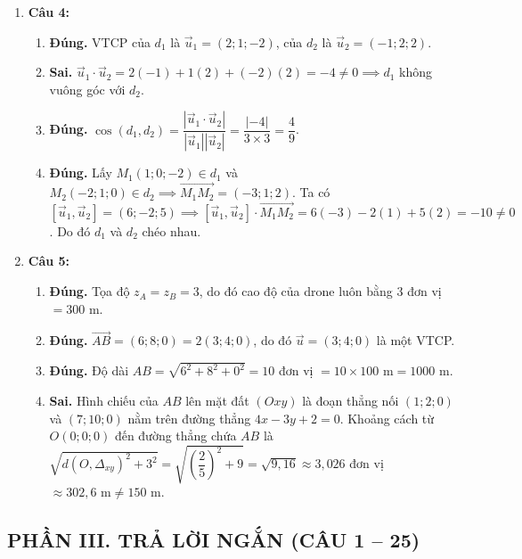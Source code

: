 \documentclass[12pt,a4paper]{article}
\begin{document}
\begin{enumerate}
\item \textbf{Câu 4:}
\begin{enumerate}[label=\alph*)]
    \item \textbf{Đúng.} VTCP của $d_1$ là $\vec{u}_1 = (2; 1; -2)$, của $d_2$ là $\vec{u}_2 = (-1; 2; 2)$.
    \item \textbf{Sai.} $\vec{u}_1 \cdot \vec{u}_2 = 2(-1) + 1(2) + (-2)(2) = -4 \ne 0 \implies d_1$ không vuông góc với $d_2$.
    \item \textbf{Đúng.} $\cos(d_1, d_2) = \dfrac{|\vec{u}_1 \cdot \vec{u}_2|}{|\vec{u}_1||\vec{u}_2|} = \dfrac{|-4|}{3 \times 3} = \dfrac{4}{9}$.
    \item \textbf{Đúng.} Lấy $M_1(1; 0; -2) \in d_1$ và $M_2(-2; 1; 0) \in d_2 \implies \vec{M_1M_2} = (-3; 1; 2)$.  
    Ta có $[\vec{u}_1, \vec{u}_2] = (6; -2; 5) \implies [\vec{u}_1, \vec{u}_2] \cdot \vec{M_1M_2} = 6(-3) - 2(1) + 5(2) = -10 \ne 0$. Do đó $d_1$ và $d_2$ chéo nhau.
\end{enumerate}

\item \textbf{Câu 5:}
\begin{enumerate}[label=\alph*)]
    \item \textbf{Đúng.} Tọa độ $z_A = z_B = 3$, do đó cao độ của drone luôn bằng $3$ đơn vị $= 300\text{ m}$.
    \item \textbf{Đúng.} $\vec{AB} = (6; 8; 0) = 2(3; 4; 0)$, do đó $\vec{u} = (3; 4; 0)$ là một VTCP.
    \item \textbf{Đúng.} Độ dài $AB = \sqrt{6^2 + 8^2 + 0^2} = 10$ đơn vị $= 10 \times 100\text{ m} = 1000\text{ m}$.
    \item \textbf{Sai.} Hình chiếu của $AB$ lên mặt đất $(Oxy)$ là đoạn thẳng nối $(1; 2; 0)$ và $(7; 10; 0)$ nằm trên đường thẳng $4x - 3y + 2 = 0$. Khoảng cách từ $O(0;0;0)$ đến đường thẳng chứa $AB$ là $\sqrt{d(O, \Delta_{xy})^2 + 3^2} = \sqrt{\left(\dfrac{2}{5}\right)^2 + 9} = \sqrt{9{,}16} \approx 3{,}026$ đơn vị $\approx 302{,}6\text{ m} \ne 150\text{ m}$.
\end{enumerate}
\end{enumerate}

\subsection*{PHẦN III. TRẢ LỜI NGẮN (CÂU 1 -- 25)}
\end{document}
